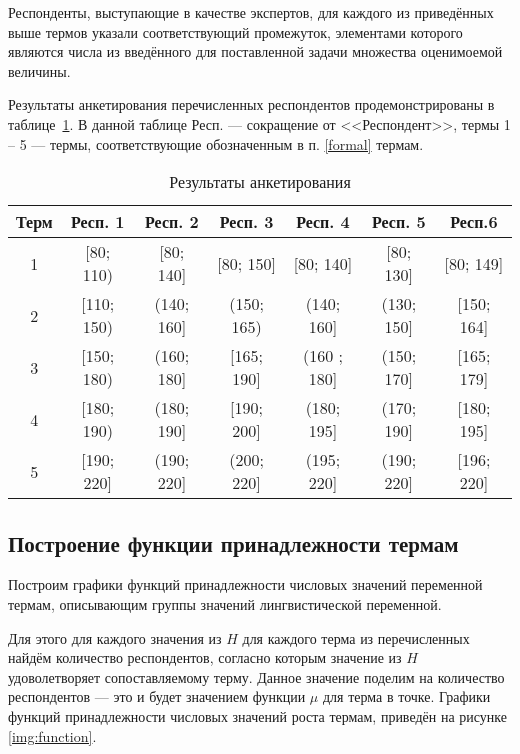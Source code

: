 Респонденты, выступающие в качестве экспертов, для каждого из приведённых выше термов указали соответствующий промежуток, элементами которого являются числа из введённого для поставленной задачи множества оценимоемой величины.

Результаты анкетирования перечисленных респондентов продемонстрированы в таблице~\ref{tbl:anket}. В данной таблице Респ. --- сокращение от <<Респондент>>, термы 1 -- 5 --- термы, соответствующие обозначенным в п. \ref{formal} термам.

\begin{center}
	\captionsetup{justification=raggedright,singlelinecheck=off}
	\begin{longtable}[c]{|c|c|c|c|c|c|c|}
		\caption{Результаты анкетирования\label{tbl:anket}}\\ \hline
		Терм & Респ. 1 & Респ. 2 & Респ. 3  & Респ. 4 & Респ. 5 & Респ.6 \\ \hline
		1 &   [80; 110) &   [80; 140] & [80; 150]  & [80; 140] & [80; 130] & [80; 149] \\ \hline
		2 &   [110; 150) &   (140; 160] & (150; 165) & (140; 160] &  (130; 150] & [150; 164]\\ \hline
		3&   [150; 180) &   (160; 180] & [165; 190] & (160 ; 180]  & (150; 170] & [165; 179]\\ \hline
		4 &   [180; 190) &  (180; 190] & [190; 200] & (180; 195] & (170; 190] & [180; 195]\\ \hline
		5 &   [190; 220]  &  (190; 220] & (200; 220] & (195; 220] &  (190; 220] & [196; 220]\\ \hline
	\end{longtable}
\end{center}

\subsection{Построение функции принадлежности термам}

Построим графики функций принадлежности числовых значений переменной термам, описывающим группы значений лингвистической переменной.

Для этого для каждого значения из $H$ для каждого терма из перечисленных найдём количество респондентов, согласно которым значение из $H$ удоволетворяет сопоставляемому терму.
Данное значение поделим на количество респондентов --- это и будет значением функции $\mu$ для терма в точке.
Графики функций принадлежности числовых значений роста термам, приведён на рисунке \ref{img:function}.


